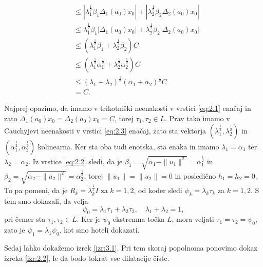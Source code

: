 \begin{dokaz}
\begin{align}
        &\leq \left| \lambda_1 ^{\frac{1}{2}}\beta_1 \Delta_1 (a_0) x_0 \right| + \left| \lambda_2 ^{\frac{1}{2}}\beta_2 \Delta_2 (a_0) x_0 \right| \label{eq:2.1}\\ 
        &\leq \lambda_1 ^{\frac{1}{2}}\beta_1  \left| \Delta_1 (a_0) x_0 \right| + \lambda_2 ^{\frac{1}{2}}\beta_2 \left| \Delta_2 (a_0) x_0 \right| \nonumber\\
        &\leq (\lambda_1 ^{\frac{1}{2}}\beta_1  + \lambda_2 ^{\frac{1}{2}}\beta_2) C \nonumber\\
        &\leq (\lambda_1 ^{\frac{1}{2}}\alpha_1 ^{\frac{1}{2}}  + \lambda_2 ^{\frac{1}{2}}\alpha_2 ^{\frac{1}{2}}) C \label{eq:2.2}  \\
        &\leq (\lambda_1 + \lambda_2)^{\frac{1}{2}} (\alpha_1 + \alpha_2) ^{\frac{1}{2}} C \label{eq:2.3} \\
        &= C. \nonumber
    \end{align}

    Najprej opazimo, da imamo v trikotniški neenakosti v vrstici \eqref{eq:2.1} enačaj in zato $\Delta_1 (a_0) x_0 = \Delta_2 (a_0) x_0 = C$, torej $\tau_1, \tau_2 \in L$.
    Prav tako imamo v Cauchyjevi neenakosti v vrstici \eqref{eq:2.3} enačaj, zato sta vektorja $(\lambda_1^{\frac{1}{2}}, \lambda_2 ^{\frac{1}{2}})$
    in $(\alpha_1^{\frac{1}{2}}, \alpha_2 ^{\frac{1}{2}})$ kolinearna. Ker sta oba tudi enotska, sta enaka in imamo $\lambda_1 = \alpha_1$ ter $\lambda_2 = \alpha_2$.
    Iz vrstice \eqref{eq:2.2} sledi, da je $\beta_1 = \sqrt{\alpha_1 - \| u_1 \|^2} = \alpha_1 ^{\frac{1}{2}}$ in 
    $\beta_2 = \sqrt{\alpha_2 - \| u_2 \|^2} = \alpha_2 ^{\frac{1}{2}}$, torej $\| u_1\| = \| u_2\| = 0$ in posledično $h_1 = h_2 = 0$.
    To pa pomeni, da je $R_k = \lambda_k ^{\frac{1}{2}} I$ za $k = 1, 2$, od koder sledi 
    $\psi_k = \lambda_k \tau_k $ za $k = 1, 2$. 
    S tem smo dokazali, da velja 
    $$\psi_0 = \lambda_1 \tau_1 + \lambda_2 \tau_2, \quad \lambda_1 + \lambda_2 = 1,$$
    pri čemer sta $\tau_1, \tau_2 \in L$.
    Ker je $\psi_0$ ekstremna točka $L$, mora veljati $\tau_1 = \tau_2 = \psi_0$,
    zato je $\psi_1 = \lambda_1 \psi_0$, kot smo hoteli dokazati.
\end{dokaz}

Sedaj lahko dokažemo izrek \ref{izr:3.1}. Pri tem skoraj popolnoma ponovimo dokaz izreka \ref{izr:2.2},
le da bodo tokrat vse dilatacije čiste.

